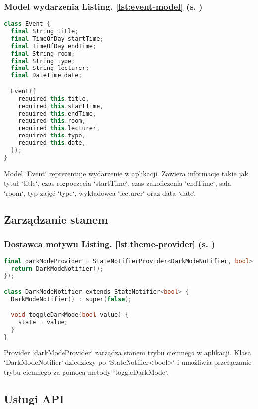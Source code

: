 \subsubsection{Model wydarzenia \textbf{Listing. \ref{lst:event-model} (s. \pageref{lst:event-model})}}
\begin{lstlisting}[language=C++, caption=Model wydarzenia, label={lst:event-model}]
class Event {
  final String title;
  final TimeOfDay startTime;
  final TimeOfDay endTime;
  final String room;
  final String type;
  final String lecturer;
  final DateTime date;

  Event({
    required this.title,
    required this.startTime,
    required this.endTime,
    required this.room,
    required this.lecturer,
    required this.type,
    required this.date,
  });
}
\end{lstlisting}
Model `Event` reprezentuje wydarzenie w aplikacji. Zawiera informacje takie jak tytuł `title`, czas rozpoczęcia `startTime`, czas zakończenia `endTime`, sala `room`, typ zajęć `type`, wykładowca `lecturer` oraz data `date`.

\subsection{Zarządzanie stanem}

\subsubsection{Dostawca motywu \textbf{Listing. \ref{lst:theme-provider} (s. \pageref{lst:theme-provider})}}
\begin{lstlisting}[language=C++, caption=Provider motywu, label={lst:theme-provider}]
final darkModeProvider = StateNotifierProvider<DarkModeNotifier, bool>((ref) {
  return DarkModeNotifier();
});

class DarkModeNotifier extends StateNotifier<bool> {
  DarkModeNotifier() : super(false);

  void toggleDarkMode(bool value) {
    state = value;
  }
}
\end{lstlisting}
Provider `darkModeProvider` zarządza stanem trybu ciemnego w aplikacji. Klasa `DarkModeNotifier` dziedziczy po `StateNotifier<bool>` i umożliwia przełączanie trybu ciemnego za pomocą metody `toggleDarkMode`.

\subsection{Usługi API}

